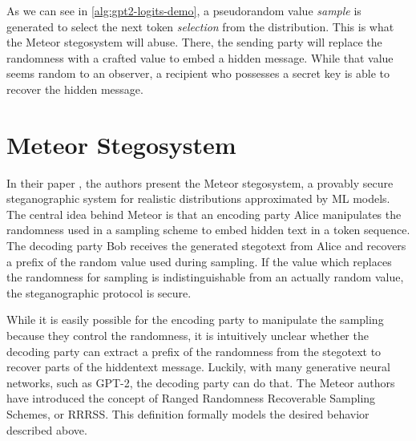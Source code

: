As we can see in \autoref{alg:gpt2-logits-demo}, a pseudorandom value \emph{sample} is generated to select the next token \emph{selection} from the distribution.
This is what the Meteor stegosystem will abuse.
There, the sending party will replace the randomness with a crafted value to embed a hidden message.
While that value seems random to an observer, a recipient who possesses a secret key is able to recover the hidden message.






\newpage

\section{Meteor Stegosystem}
\label{sec:meteor}
In their paper \cite{Meteor2021}, the authors present the Meteor stegosystem, a provably secure steganographic system for realistic distributions approximated by ML models.
The central idea behind Meteor is that an encoding party Alice manipulates the randomness used in a sampling scheme to embed hidden text in a token sequence.
The decoding party Bob receives the generated stegotext from Alice and recovers a prefix of the random value used during sampling.
If the value which replaces the randomness for sampling is indistinguishable from an actually random value, the steganographic protocol is secure.

While it is easily possible for the encoding party to manipulate the sampling because they control the randomness, it is intuitively unclear whether the decoding party can extract a prefix of the randomness from the stegotext to recover parts of the hiddentext message.
Luckily, with many generative neural networks, such as GPT-2, the decoding party can do that.
The Meteor authors have introduced the concept of Ranged Randomness Recoverable Sampling Schemes, or RRRSS.
This definition formally models the desired behavior described above.

